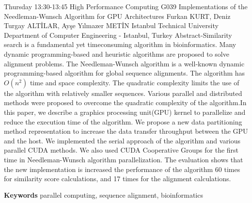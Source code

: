 
    \begin{abstract_basarim}
    {Thursday 13:30-13:45}
    {High Performance Computing}
    {G039}
    {Implementations of the Needleman-Wunsch Algorithm for GPU Architectures}
    {%
    Furkan KURT, Deniz Turgay ALTİLAR, Ayşe Yılmazer METİN}
    {%
    }
    {%
    Istanbul Technical University Department of Computer Engineering - Istanbul, Turkey}
    Abstract-Similarity search is a fundamental yet timeconsuming algorithm in bioinformatics. Many dynamic programming-based and heuristic algorithms are proposed to solve alignment problems. The Needleman-Wunsch algorithm is a well-known dynamic programming-based algorithm for global sequence alignments. The algorithm has $O\left(n^{2}\right)$ time and space complexity. The quadratic complexity limits the use of the algorithm with relatively smaller sequences. Various parallel and distributed methods were proposed to overcome the quadratic complexity of the algorithm.\newline In this paper, we describe a graphics processing unit(GPU) kernel to parallelize and reduce the execution time of the algorithm. We propose a new data partitioning method representation to increase the data transfer throughput between the GPU and the host. We implemented the serial approach of the algorithm and various parallel CUDA methods. We also used CUDA Cooperative Groups for the first time in Needleman-Wunsch algorithm parallelization. The evaluation shows that the new implementation is increased the performance of the algorithm 60 times for similarity score calculations, and 17 times for the alignment calculations. 
    
        \textbf{Keywords} \newline{}parallel computing, sequence alignment, bioinformatics
    \end{abstract_basarim}
    